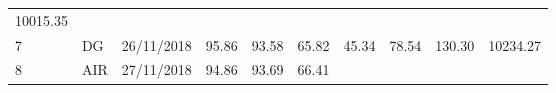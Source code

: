 \documentclass[
  11pt,
]{article}
\begin{document}
\begin{longtable}[]{@{}llllllllll@{}}
\begin{minipage}[t]{0.08\columnwidth}
10015.35\strut
\end{minipage}\tabularnewline
\begin{minipage}[t]{0.04\columnwidth}\raggedright
7\strut
\end{minipage} & \begin{minipage}[t]{0.09\columnwidth}\raggedright
DG\strut
\end{minipage} & \begin{minipage}[t]{0.10\columnwidth}\raggedright
26/11/2018\strut
\end{minipage} & \begin{minipage}[t]{0.06\columnwidth}\raggedright
95.86\strut
\end{minipage} & \begin{minipage}[t]{0.06\columnwidth}\raggedright
93.58\strut
\end{minipage} & \begin{minipage}[t]{0.06\columnwidth}\raggedright
65.82\strut
\end{minipage} & \begin{minipage}[t]{0.06\columnwidth}\raggedright
45.34\strut
\end{minipage} & \begin{minipage}[t]{0.06\columnwidth}\raggedright
78.54\strut
\end{minipage} & \begin{minipage}[t]{0.13\columnwidth}\raggedright
130.30\strut
\end{minipage} & \begin{minipage}[t]{0.08\columnwidth}\raggedright
10234.27\strut
\end{minipage}\tabularnewline
\begin{minipage}[t]{0.04\columnwidth}\raggedright
8\strut
\end{minipage} & \begin{minipage}[t]{0.09\columnwidth}\raggedright
AIR\strut
\end{minipage} & \begin{minipage}[t]{0.10\columnwidth}\raggedright
27/11/2018\strut
\end{minipage} & \begin{minipage}[t]{0.06\columnwidth}\raggedright
94.86\strut
\end{minipage} & \begin{minipage}[t]{0.06\columnwidth}\raggedright
93.69\strut
\end{minipage} & \begin{minipage}[t]{0.06\columnwidth}\raggedright
66.41\strut
\end{minipage} & \begin{minipage}[t]{0.06\columnwidth}\raggedright

\end{minipage}
\end{longtable}
\end{document}
